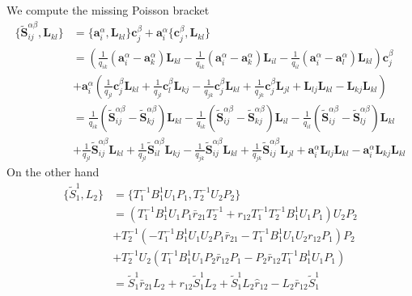 \documentclass[11pt]{report}
\theoremstyle{definition}
\theoremstyle{remark}
\theoremstyle{remark}
\begin{document}
We compute the missing Poisson bracket
\begin{align*}
\{ \tilde{\mathbf{S}}_{ij}^{\alpha\beta}, \mathbf{L}_{kl} \}
&= \{ \mathbf{a}_i^\alpha, \mathbf{L}_{kl} \} \mathbf{c}_j^\beta + \mathbf{a}_i^\alpha \{ \mathbf{c}_j^\beta, \mathbf{L}_{kl} \} \\
&= (\frac{1}{q_{ik}}(\mathbf{a}_i^\alpha-\mathbf{a}_k^\alpha) \mathbf{L}_{kl} - \frac{1}{q_{ik}}(\mathbf{a}_i^\alpha-\mathbf{a}_k^\alpha) \mathbf{L}_{il} - \frac{1}{q_{il}}(\mathbf{a}_i^\alpha-\mathbf{a}_l^\alpha)\mathbf{L}_{kl}) \mathbf{c}_j^\beta \\
&+ \mathbf{a}_i^\alpha (\frac{1}{q_{jl}}\mathbf{c}_j^\beta \mathbf{L}_{kl}+\frac{1}{q_{jl}}\mathbf{c}_l^\beta \mathbf{L}_{kj}-\frac{1}{q_{jk}} \mathbf{c}_j^\beta \mathbf{L}_{kl} + \frac{1}{q_{jk}} \mathbf{c}_j^\beta \mathbf{L}_{jl} + \mathbf{L}_{lj} \mathbf{L}_{kl}-\mathbf{L}_{kj} \mathbf{L}_{kl}) \\
&= \frac{1}{q_{ik}} (\tilde{\mathbf{S}}_{ij}^{\alpha\beta} - \tilde{\mathbf{S}}_{kj}^{\alpha\beta}) \mathbf{L}_{kl} - \frac{1}{q_{ik}} (\tilde{\mathbf{S}}_{ij}^{\alpha\beta}-\tilde{\mathbf{S}}_{kj}^{\alpha\beta}) \mathbf{L}_{il} - \frac{1}{q_{il}} (\tilde{\mathbf{S}}_{ij}^{\alpha\beta}-\tilde{\mathbf{S}}_{lj}^{\alpha\beta}) \mathbf{L}_{kl} \\
&+ \frac{1}{q_{jl}} \tilde{\mathbf{S}}_{ij}^{\alpha\beta} \mathbf{L}_{kl} + \frac{1}{q_{jl}} \tilde{\mathbf{S}}_{il}^{\alpha\beta} \mathbf{L}_{kj} - \frac{1}{q_{jk}} \tilde{\mathbf{S}}_{ij}^{\alpha\beta} \mathbf{L}_{kl} + \frac{1}{q_{jk}} \tilde{\mathbf{S}}_{ij}^{\alpha\beta} \mathbf{L}_{jl} + \mathbf{a}_i^\alpha \mathbf{L}_{lj} \mathbf{L}_{kl}-\mathbf{a}_i^\alpha \mathbf{L}_{kj} \mathbf{L}_{kl}
\end{align*}
On the other hand
\begin{align*}
\{ \tilde{S}_1^1, L_2 \}
&= \{ T_1^{-1} B_1^1 U_1 P_1, T_2^{-1} U_2 P_2 \} \\
&= (T_1^{-1} B_1^1 U_1 P_1 \bar r_{21} T_2^{-1} + r_{12} T_1^{-1} T_2^{-1} B_1^1 U_1 P_1) U_2 P_2 \\
&+ T_2^{-1} (-T_1^{-1} B_1^1 U_1 U_2 P_1 \bar r_{21} - T_1^{-1} B_1^1 U_1 U_2 r_{12} P_1) P_2 \\
&+ T_2^{-1} U_2 (T_1^{-1} B_1^1 U_1 P_2 \bar r_{12} P_1 - P_2 \bar r_{12} T_1^{-1} B_1^1 U_1 P_1) \\
&= \tilde S_1^1 \bar r_{21} L_2 + r_{12} \tilde S_1^1 L_2 + \tilde S_1^1 L_2 \hat r_{12} - L_2 \bar r_{12} \tilde S_1^1
\end{align*}
\end{document}
